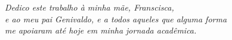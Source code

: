 \begin{dedicatoria}
   \vspace*{\fill}
   \centering
   \noindent
   \textit{Dedico este trabalho à minha mãe, Franscisca,\\
   e ao meu pai Genivaldo, e a todos aqueles que alguma forma\\
   me apoiaram até hoje em minha jornada acadêmica.}\vspace*{\fill}
\end{dedicatoria}
